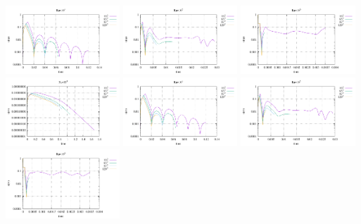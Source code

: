 \begin{center}
\includegraphics[width=4.297cm]{python_codes/fieldstone_155/results/conv_u_Ra1e4}
\includegraphics[width=4.297cm]{python_codes/fieldstone_155/results/conv_u_Ra1e5}
\includegraphics[width=4.297cm]{python_codes/fieldstone_155/results/conv_u_Ra1e6}\\
\includegraphics[width=4.297cm]{python_codes/fieldstone_155/results/conv_v_Ra1e3}
\includegraphics[width=4.297cm]{python_codes/fieldstone_155/results/conv_v_Ra1e4}
\includegraphics[width=4.297cm]{python_codes/fieldstone_155/results/conv_v_Ra1e5}
\includegraphics[width=4.297cm]{python_codes/fieldstone_155/results/conv_v_Ra1e6}\\

\end{center}
